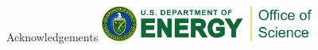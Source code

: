 \documentclass{beamer}
\begin{document}
\begin{frame}{}
\begin{columns}[t]
\begin{column}{0.32\textwidth}
\begin{block}{\label{sec:acknowledgements}Acknowledgements}
                    \centering \includegraphics[width=7cm]{logos/RGB_Color-Seal_Green-Mark_SC_Horizontal.png}
                \end{block}
            \end{column}
        \end{columns}
    \end{frame}
\end{document}
